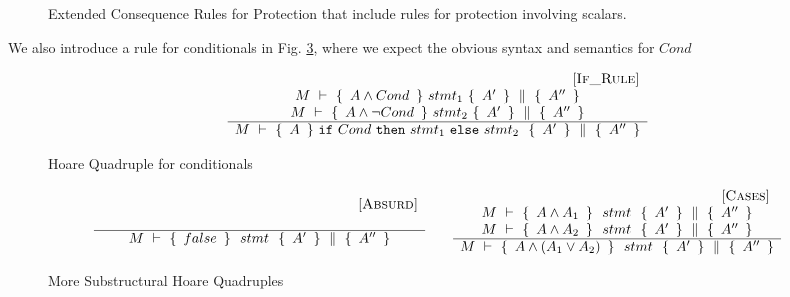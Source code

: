 \begin{figure}[htb]
\caption{Extended Consequence Rules for Protection that include rules for protection involving scalars.}
\label{f:protection:conseq:ext}
\end{figure}

We also introduce a rule for conditionals in Fig. \ref{f:if}, {where we expect the obvious syntax and semantics for $Cond$}

\begin{figure}[htb]
$$
\begin{array}{c} \strut \ \ \ \ \ \ \ \ \ \ \ \ \ \ \ \ \ \ \ \ \ \ \ \ \ \ \ \ \ \ \ \ \ \ \ \ \ \ \ \ \ \ \ \ \ \ \ \ \ \ {{\mbox{\hspace{2.5cm} [\sc{If\_Rule}]}}} \\ 
	 \begin{array}{c}
	  M\ \vdash\ \{\,\  A \wedge Cond \  \, \} \    stmt_1   \  \{\,\ A' \ \, \}\, \,\parallel\,\, \{\, \ A'' \  \, \}
	\\
	    M\ \vdash\ \{\,\  A \wedge \neg Cond \  \, \} \    stmt_2   \  \{\,\ A' \ \, \}\, \,\parallel\,\, \{\, \ A'' \  \, \}	
	\end{array}
	 \\ \hline   	
	M\ \vdash\ \{\,\  A \  \, \} \  \mbox{\normalfont{\texttt{if}}}\ Cond\ \mbox{\normalfont{\texttt{then}}}\ stmt_1\ \mbox{\normalfont{\texttt{else}}}\ stmt_2 \ \  \{\,\ A' \ \, \}\, \,\parallel\,\, \{\, \ A'' \  \, \}
 \end{array}
$$
\caption{Hoare Quadruple  for conditionals}
\label{f:if}
\end{figure}


\begin{figure}[htb]
$$
\begin{array}{lcl}
{{
 \begin{array}{c} \strut \ \ \ \ \ \ \ \ \ \ \ \ \ \ \ \ \ \ \ \ \ \ \ \ \ \ \ \ \ \ \ \ \ \ \ \ \ \ \ \ \ \ \ \ \ \ \ \ \ \ {{\mbox{\hspace{0.5cm} [\sc{Absurd}]}}} \\ 	
	 \\ \hline   	
	M\ \vdash\ \{\,\  false \  \, \} \  \ stmt \ \  \{\,\ A' \ \, \}\, \,\parallel\,\, \{\, \ A'' \  \, \} 
 \end{array} 
}} & &
{{
\begin{array}{c} \strut \ \ \ \ \ \ \ \ \ \ \ \ \ \ \ \ \ \ \ \ \ \ \ \ \ \ \ \ \ \ \ \ \ \ \ \ \ \ \ \ \ \ \ \ \ \ \ \ \ \ {{\mbox{\hspace{0.5cm} [\sc{Cases}]}}} \\  \begin{array}{l}
	M\ \vdash\ \{\,\  A \wedge A_{1}  \  \, \} \  \ stmt \ \  \{\,\ A' \ \, \}\, \,\parallel\,\, \{\, \ A'' \  \, \}
		\\
		M\ \vdash\ \{\,\   A \wedge A_{2} \  \, \} \  \ stmt \ \  \{\,\ A' \ \, \}\, \,\parallel\,\, \{\, \ A'' \  \, \}
	\end{array}	
	 \\ \hline   	
	M\ \vdash\ \{\,\  A \wedge (A_1 \vee A_2) \  \, \} \  \ stmt \ \  \{\,\ A' \ \, \}\, \,\parallel\,\, \{\, \ A'' \  \, \}
 \end{array}
}}
\end{array}
$$
\caption{More Substructural Hoare Quadruples}
\label{f:if}
\end{figure}


